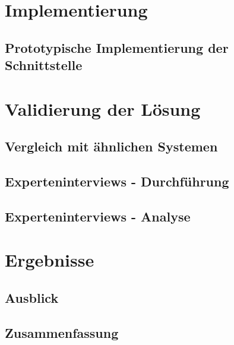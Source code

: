 \documentclass[draft,final]{vutinfth} %
\begin{document}
\chapter{Implementierung}

\section{Prototypische Implementierung der Schnittstelle}



\chapter{Validierung der Lösung}

\section{Vergleich mit ähnlichen Systemen}

\section{Experteninterviews - Durchführung}

\section{Experteninterviews - Analyse}



\chapter{Ergebnisse}

\section{Ausblick}

\section{Zusammenfassung}



\backmatter

\listoffigures %

\cleardoublepage %
\listoftables %

\listofalgorithms
{}

\printindex

\printglossaries



\end{document}
